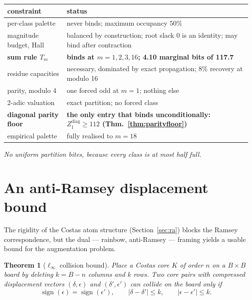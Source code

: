 \documentclass[11pt,a4paper]{article}
\newtheorem{theorem}{Theorem}[section]
\theoremstyle{definition}
\newcommand{\sgn}{\operatorname{sign}}
\begin{document}
\begin{center}
\begin{tabular}{@{}lp{}@{}}
\toprule
constraint & status \\
\midrule
per-class palette & never binds; maximum occupancy $50\%$ \\
magnitude budget, Hall & balanced by construction; root slack 0 is an identity;
  may bind after contraction \\
\textbf{sum rule $T_m$} & \textbf{binds at $m=1,2,3,16$; 4.10 marginal bits of 117.7} \\
residue capacities & necessary, dominated by exact propagation; $8\%$ recovery at
  modulo 16 \\
parity, modulo 4 & one forced odd at $m=1$; nothing else \\
2-adic valuation & exact partition; no forced class \\
\textbf{diagonal parity floor} & \textbf{the only entry that binds
  unconditionally: $Z_1^{\mathrm{diag}}\ge112$ (Thm.~\ref{thm:parityfloor})} \\
empirical palette & fully realised to $m=18$ \\
\bottomrule
\end{tabular}
\end{center}

\emph{No uniform partition bites, because every class is at most half full.}

\section{An anti-Ramsey displacement bound}
\label{sec:antiramsey}

The rigidity of the Costas atom structure (Section~\ref{sec:ra}) blocks the
Ramsey correspondence, but the dual --- rainbow, anti-Ramsey --- framing yields a
usable bound for the augmentation problem.

\begin{theorem}[$\ell_\infty$ collision bound]
\label{thm:linfty}
Place a Costas core $K$ of order $n$ on a $B\times B$ board by deleting $k=B-n$
columns and $k$ rows. Two core pairs with compressed displacement vectors
$(\delta,\epsilon)$ and $(\delta',\epsilon')$ can collide on the board only if
\[
\sgn(\epsilon)=\sgn(\epsilon'), \qquad
|\delta-\delta'| \le k, \qquad
|\epsilon-\epsilon'| \le k .
\]
\end{theorem}
\end{document}
